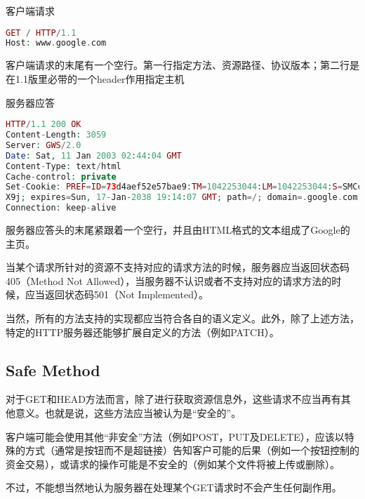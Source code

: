 \begin{compactitem}
\item 客户端请求

\begin{lstlisting}[language=PHP]
GET / HTTP/1.1
Host: www.google.com
\end{lstlisting}

客户端请求的末尾有一个空行。第一行指定方法、资源路径、协议版本；第二行是在1.1版里必带的一个header作用指定主机

\item 服务器应答

\begin{lstlisting}[language=PHP]
HTTP/1.1 200 OK
Content-Length: 3059
Server: GWS/2.0
Date: Sat, 11 Jan 2003 02:44:04 GMT
Content-Type: text/html
Cache-control: private
Set-Cookie: PREF=ID=73d4aef52e57bae9:TM=1042253044:LM=1042253044:S=SMCc_HRPCQiqy
X9j; expires=Sun, 17-Jan-2038 19:14:07 GMT; path=/; domain=.google.com
Connection: keep-alive
\end{lstlisting}

服务器应答头的末尾紧跟着一个空行，并且由HTML格式的文本组成了Google的主页。

\end{compactitem}







当某个请求所针对的资源不支持对应的请求方法的时候，服务器应当返回状态码405（Method Not Allowed），当服务器不认识或者不支持对应的请求方法的时候，应当返回状态码501（Not Implemented）。


当然，所有的方法支持的实现都应当符合各自的语义定义。此外，除了上述方法，特定的HTTP服务器还能够扩展自定义的方法（例如PATCH）。



\subsection{Safe Method}


对于GET和HEAD方法而言，除了进行获取资源信息外，这些请求不应当再有其他意义。也就是说，这些方法应当被认为是“安全的”。 

客户端可能会使用其他“非安全”方法（例如POST，PUT及DELETE），应该以特殊的方式（通常是按钮而不是超链接）告知客户可能的后果（例如一个按钮控制的资金交易），或请求的操作可能是不安全的（例如某个文件将被上传或删除）。

不过，不能想当然地认为服务器在处理某个GET请求时不会产生任何副作用。

